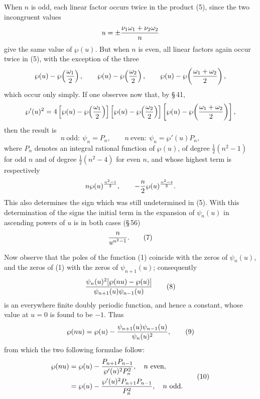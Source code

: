 \documentclass[11pt]{article}
\begin{document}
When $n$ is odd, each linear factor occurs twice in the product (5), since the two
incongruent values
\[
u=\pm{\nu_1\omega_1+\nu_2\omega_2\over n}
\]
give the same value of $\wp(u)$. But when $n$ is even, all linear factors again occur twice
in (5), with the exception of the three
\[
\wp(u)-\wp\!\left({\omega_1\over2}\right),\qquad
\wp(u)-\wp\!\left({\omega_2\over2}\right),\qquad
\wp(u)-\wp\!\left({\omega_1+\omega_2\over2}\right),
\]
which occur only simply. If one observes now that, by \S\,41,
\[
\wp'(u)^2=
4\left[\wp(u)-\wp\!\left({\omega_1\over2}\right)\right]
\left[\wp(u)-\wp\!\left({\omega_2\over2}\right)\right]
\left[\wp(u)-\wp\!\left({\omega_1+\omega_2\over2}\right)\right],
\]
then the result is
\begin{equation}
n\ \text{odd}:\ \psi_n=P_n,\qquad
n\ \text{even}:\ \psi_n=\wp'(u)P_n,
\tag{6}
\end{equation}
where $P_n$ denotes an integral rational function of $\wp(u)$, of degree
$\frac12(n^2-1)$ for odd $n$ and of degree $\frac12(n^2-4)$ for even $n$, and whose
highest term is respectively
\[
n\wp(u)^{\frac{n^2-1}{2}},\qquad -{n\over2}\wp(u)^{\frac{n^2-4}{2}}.
\]
This also determines the sign which was still undetermined in (5). With this determination
of the signs the initial term in the expansion of $\psi_n(u)$ in ascending powers of $u$ is
in both cases (\S\,56)
\begin{equation}
{n\over u^{n^2-1}}.
\tag{7}
\end{equation}

Now observe that the poles of the function (1) coincide with the zeros of $\psi_n(u)$, and
the zeros of (1) with the zeros of $\psi_{n+1}(u)$; consequently
\begin{equation}
{\psi_n(u)^2[\wp(nu)-\wp(u)]\over \psi_{n+1}(u)\psi_{n-1}(u)}
\tag{8}
\end{equation}
is an everywhere finite doubly periodic function, and hence a constant, whose value at
$u=0$ is found to be $-1$. Thus
\begin{equation}
\wp(nu)=\wp(u)-{\psi_{n+1}(u)\psi_{n-1}(u)\over \psi_n(u)^2},
\tag{9}
\end{equation}
from which the two following formulae follow:
\begin{equation}
\begin{aligned}
\wp(nu)&=\wp(u)-{P_{n+1}P_{n-1}\over \wp'(u)^2P_n^2},\quad n\ \text{even},\\
&=\wp(u)-{\wp'(u)^2P_{n+1}P_{n-1}\over P_n^2},\quad n\ \text{odd}.
\end{aligned}
\tag{10}
\end{equation}
\end{document}
